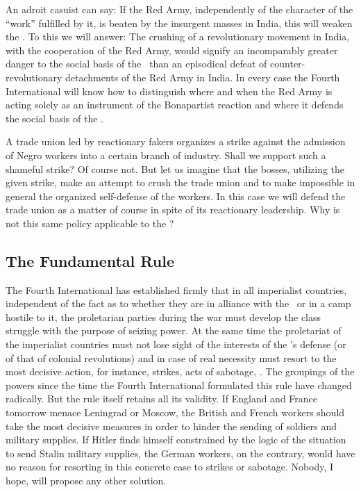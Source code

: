 An adroit casuist can say: If the Red Army, independently of the character of the “work” fulfilled by it, is beaten by the insurgent masses in India, this will weaken the \USSR. To this we will answer: The crushing of a revolutionary movement in India, with the cooperation of the Red Army, would signify an incomparably greater danger to the social basis of the \USSR\ than an episodical defeat of counter-revolutionary detachments of the Red Army in India. In every case the Fourth International will know how to distinguish where and when the Red Army is acting solely as an instrument of the Bonapartist reaction and where it defends the social basis of the \USSR.

A trade union led by reactionary fakers organizes a strike against the admission of Negro workers into a certain branch of industry. Shall we support such a shameful strike? Of course not. But let us imagine that the bosses, utilizing the given strike, make an attempt to crush the trade union and to make impossible in general the organized self-defense of the workers. In this case we will defend the trade union as a matter of course in spite of its reactionary leadership. Why is not this same policy applicable to the \USSR?

\subsection*{The Fundamental Rule}

The Fourth International has established firmly that in all imperialist countries, independent of the fact as to whether they are in alliance with the \USSR\ or in a camp hostile to it, the proletarian parties during the war must develop the class struggle with the purpose of seizing power. At the same time the proletariat of the imperialist countries must not lose sight of the interests of the \USSR’s defense (or of that of colonial revolutions) and in case of real necessity must resort to the most decisive action, for instance, strikes, acts of sabotage, \etc. The groupings of the powers since the time the Fourth International formulated this rule have changed radically. But the rule itself retains all its validity. If England and France tomorrow menace Leningrad or Moscow, the British and French workers should take the most decisive measures in order to hinder the sending of soldiers and military supplies. If Hitler finds himself constrained by the logic of the situation to send Stalin military supplies, the German workers, on the contrary, would have no reason for resorting in this concrete case to strikes or sabotage. Nobody, I hope, will propose any other solution.

